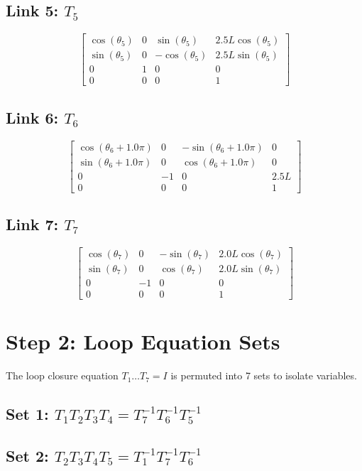 \documentclass[12pt, a4paper]{article}
\begin{document}
\subsection*{Link 5: $T_{5}$}
\[ \left[\begin{matrix}\cos{\left(\theta_{5} \right)} & 0 & \sin{\left(\theta_{5} \right)} & 2.5 L \cos{\left(\theta_{5} \right)}\\\sin{\left(\theta_{5} \right)} & 0 & - \cos{\left(\theta_{5} \right)} & 2.5 L \sin{\left(\theta_{5} \right)}\\0 & 1 & 0 & 0\\0 & 0 & 0 & 1\end{matrix}\right] \]
\subsection*{Link 6: $T_{6}$}
\[ \left[\begin{matrix}\cos{\left(\theta_{6} + 1.0 \pi \right)} & 0 & - \sin{\left(\theta_{6} + 1.0 \pi \right)} & 0\\\sin{\left(\theta_{6} + 1.0 \pi \right)} & 0 & \cos{\left(\theta_{6} + 1.0 \pi \right)} & 0\\0 & -1 & 0 & 2.5 L\\0 & 0 & 0 & 1\end{matrix}\right] \]
\subsection*{Link 7: $T_{7}$}
\[ \left[\begin{matrix}\cos{\left(\theta_{7} \right)} & 0 & - \sin{\left(\theta_{7} \right)} & 2.0 L \cos{\left(\theta_{7} \right)}\\\sin{\left(\theta_{7} \right)} & 0 & \cos{\left(\theta_{7} \right)} & 2.0 L \sin{\left(\theta_{7} \right)}\\0 & -1 & 0 & 0\\0 & 0 & 0 & 1\end{matrix}\right] \]
\newpage

\section{Step 2: Loop Equation Sets}
The loop closure equation $T_1 \dots T_7 = I$ is permuted into 7 sets to isolate variables.
\subsection*{Set 1: $T_{1}T_{2}T_{3}T_{4} = T_{7}^{-1}T_{6}^{-1}T_{5}^{-1}$}
\subsection*{Set 2: $T_{2}T_{3}T_{4}T_{5} = T_{1}^{-1}T_{7}^{-1}T_{6}^{-1}$}
\end{document}

